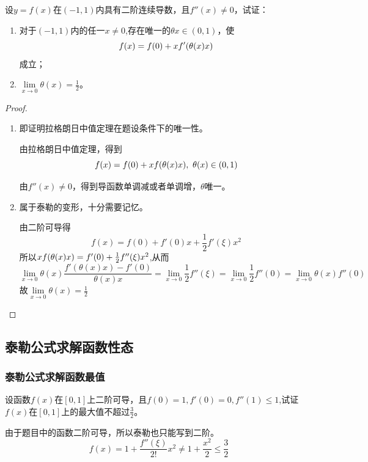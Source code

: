 \begin{problem}
	设$y=f(x)\mbox{在}(-1,1)$内具有二阶连续导数，且$f''(x)\neq 0$，试证：
	\begin{enumerate}[label=(\arabic*)]
		\item 对于$(-1,1)$内的任一$x\neq 0$,存在唯一的$\theta x\in(0,1)$，使$$f(x)=f(0)+xf'\qty(\theta(x)x)$$成立；
		\item  $\lim\limits_{x\rightarrow 0}\theta(x)=\frac{1}{2}$。
	\end{enumerate}
    \begin{proof}
    	\begin{enumerate}[label=(\arabic*)]
    		\item 即证明拉格朗日中值定理在题设条件下的唯一性。
    		
    		由拉格朗日中值定理，得到$$f(x)=f(0)+xf\qty(\theta(x)x),~\theta(x)\in(0,1)$$
    		
    		由$f''(x)\neq 0$，得到导函数单调减或者单调增，$\theta$唯一。
    		\item  属于泰勒的变形，十分需要记忆。
    		
    		由二阶可导得$$f(x)=f(0)+f'(0)x+\frac{1}{2}f'(\xi)x^2$$所以$xf\qty(\theta(x)x)=f'(0)+
    		\frac{1}{2}f''(\xi)x^2$,从而$$\lim\limits_{x\rightarrow 0}\theta(x)\frac{f'(\theta(x)x)-f'(0)}{\theta(x)x}=\lim\limits_{x\rightarrow 0}\frac{1}{2}f''(\xi)=\lim\limits_{x\rightarrow 0}\frac{1}{2}f''(0)=\lim\limits_{x\rightarrow 0}\theta(x)f''(0)$$
    		故$\lim\limits_{x\rightarrow 0}\theta(x)=\frac{1}{2}$
    	\end{enumerate}
    \end{proof}
\end{problem}

\subsection{泰勒公式求解函数性态}
\subsubsection{泰勒公式求解函数最值}
\begin{problem}
	设函数$f(x)$在$[0,1]$上二阶可导，且$f(0)=1,f'(0)=0,f''(1)\leq 1$,试证$f(x)$在$[0,1]$上的最大值不超过$\frac{3}{2}$。
	\begin{solution}
		由于题目中的函数二阶可导，所以泰勒也只能写到二阶。
		$$f(x)=1+\frac{f''(\xi)}{2!}x^2\neq 1+\frac{x^2}{2}\leq\frac{3}{2}$$
	\end{solution}
\end{problem}

